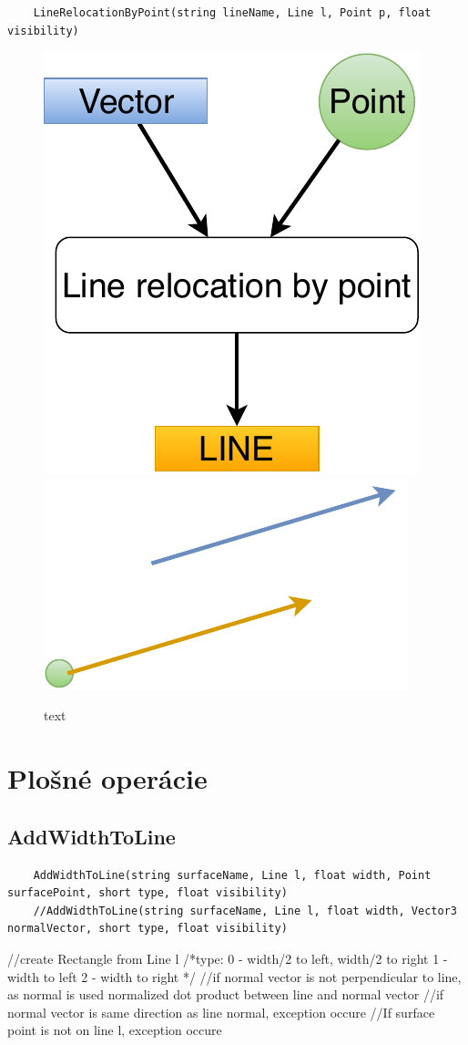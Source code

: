 \begin{lstlisting}
	LineRelocationByPoint(string lineName, Line l, Point p, float visibility)
\end{lstlisting}


\begin{figure}[H]
	\centering
	\includegraphics[height=0.3\textwidth]{obrazky-figures/Diagram/Line/DP Navrh operacii-1D - LineRelocation.pdf}
	\includegraphics[height=0.3\textwidth]{obrazky-figures/Diagram/Draw/2Line/DP Navrh operacii-1D - LineRelocation.pdf}
	\caption{text}
	\label{fig:1}
\end{figure}






\section{Plošné operácie}


\subsection{AddWidthToLine}
\begin{lstlisting}
	AddWidthToLine(string surfaceName, Line l, float width, Point surfacePoint, short type, float visibility)
	//AddWidthToLine(string surfaceName, Line l, float width, Vector3 normalVector, short type, float visibility)
\end{lstlisting}
//create Rectangle from Line l
/*type:
	0 - width/2 to left, width/2 to right
	1 - width to left
	2 - width to right
	*/
	//if normal vector is not perpendicular to line, as normal is used normalized dot product between line and normal vector
	//if normal vector is same direction as line normal, exception occure
	//If surface point is not on line l, exception occure

